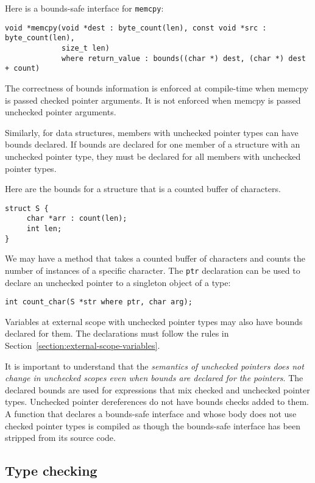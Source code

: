 Here is a bounds-safe interface for \texttt{memcpy}:
\begin{verbatim}
void *memcpy(void *dest : byte_count(len), const void *src : byte_count(len), 
             size_t len) 
             where return_value : bounds((char *) dest, (char *) dest + count)
\end{verbatim}

The correctness of bounds information is enforced at compile-time when
memcpy is passed checked pointer arguments. It is not enforced when memcpy
is passed unchecked pointer arguments.

Similarly, for data structures, members with unchecked pointer types can
have bounds declared. If bounds are declared for one member of a
structure with an unchecked pointer type, they must be declared for all
members with unchecked pointer types.

Here are the bounds for a structure that is a counted buffer of
characters.
\begin{verbatim}
struct S {
     char *arr : count(len);
     int len;
}
\end{verbatim}

We may have a method that takes a counted buffer of characters and
counts the number of instances of a specific character. The \texttt{ptr}
declaration can be used to declare an unchecked pointer to a singleton
object of a type:
\begin{verbatim}
int count_char(S *str where ptr, char arg);
\end{verbatim}

Variables at external scope with unchecked pointer types may also have
bounds declared for them.   The declarations must follow the 
rules in Section~\ref{section:external-scope-variables}.

It is important to understand that the \emph{semantics of unchecked
pointers does not change in unchecked scopes even when bounds are
declared for the pointers}. The declared bounds are used  for expressions
that mix checked and unchecked pointer types. Unchecked pointer dereferences do not
have bounds checks added to them. A function that declares a bounds-safe 
interface and whose body does not use checked pointer
types is compiled as though the bounds-safe interface has been
stripped from its source code.

\subsection{Type checking}

